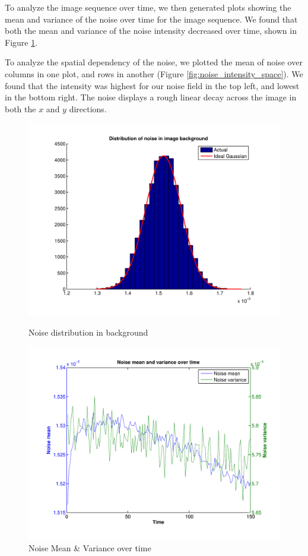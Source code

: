 \documentclass{article}
\begin{document}
To analyze the image sequence over time, we then generated plots showing the mean and variance of the noise over time for the image sequence. We found that both the mean and variance of the noise intensity decreased over time, shown in Figure \ref{fig:noise_mean_var_time}.

To analyze the spatial dependency of the noise, we plotted the mean of noise over columns in one plot, and rows in another (Figure \ref{fig:noise_intensity_space}). We found that the intensity was highest for our noise field in the top left, and lowest in the bottom right. The noise displays a rough linear decay across the image in both the $x$ and $y$ directions.

\begin{figure}[b]
\begin{minipage}[b]{0.45\linewidth}
\centering
\includegraphics[width=\textwidth]{figures/noise_distribution.pdf}
\caption{Noise distribution in background}
\label{fig:noise_dist_background}
\end{minipage}
\hspace{0.5cm}
\begin{minipage}[b]{0.45\linewidth}
\centering
\includegraphics[width=\textwidth]{figures/noise_over_time.pdf}
\caption{Noise Mean \& Variance over time}
\label{fig:noise_mean_var_time}
\end{minipage}
\end{figure}
\end{document}
